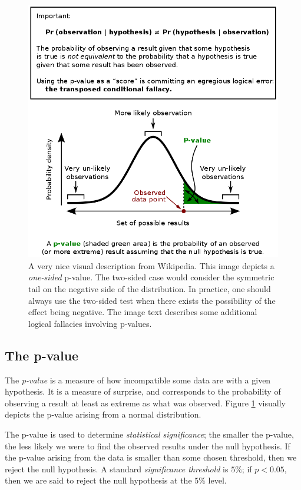 \documentclass{tufte-handout}
\begin{document}
\begin{figure}[!ht]
  \includegraphics{./images/p-value}
  \caption{A very nice visual description from Wikipedia. This image
    depicts a \emph{one-sided} p-value. The two-sided case would consider
    the symmetric tail on the negative side of the distribution. In practice,
    one should always use the two-sided test when there exists the possibility
    of the effect being negative. The image text describes some additional
    logical fallacies involving p-values.}
  \label{fig:p-value}
\end{figure}

\subsection{The p-value}
\label{sec:org6f8c447}
The \emph{p-value} is a measure of how incompatible some data are with a given
hypothesis. It is a measure of surprise, and corresponds to the probability of
observing a result at least as extreme as what was observed. Figure
\ref{fig:p-value} visually depicts the p-value arising from a normal
distribution.

The p-value is used to determine \emph{statistical significance}; the smaller the
p-value, the less likely we were to find the observed results under the null
hypothesis. If the p-value arising from the data is smaller than some chosen
threshold, then we reject the null hypothesis. A standard \emph{significance
threshold} is \(5\%\); if \(p<0.05\), then we are said to reject the null hypothesis
at the \(5\%\) level.
\end{document}
